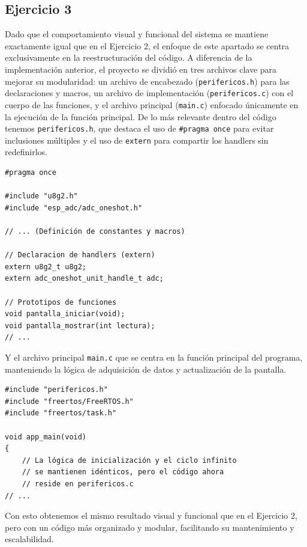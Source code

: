 \documentclass[12pt, letterpaper]{article}
\begin{document}
\subsection*{\fontsize{12}{17}\sffamily\selectfont Ejercicio 3}

Dado que el comportamiento visual y funcional del sistema se mantiene exactamente igual que en el Ejercicio 2, el enfoque de este apartado se centra exclusivamente en la reestructuración del código. A diferencia de la implementación anterior, el proyecto se dividió en tres archivos clave para mejorar su modularidad: un archivo de encabezado (\texttt{perifericos.h}) para las declaraciones y macros, un archivo de implementación (\texttt{perifericos.c}) con el cuerpo de las funciones, y el archivo principal (\texttt{main.c}) enfocado únicamente en la ejecución de la función principal. De lo más relevante dentro del código tenemos \texttt{perifericos.h}, que destaca el uso de \texttt{\#pragma once} para evitar inclusiones múltiples y el uso de \texttt{extern} para compartir los handlers sin redefinirlos.

\begin{lstlisting}[style=cstyle, caption={Archivo de encabezado \texttt{perifericos.h}.}, label={lst:perifericos_h}]
#pragma once

#include "u8g2.h"
#include "esp_adc/adc_oneshot.h"

// ... (Definición de constantes y macros)

// Declaracion de handlers (extern)
extern u8g2_t u8g2;
extern adc_oneshot_unit_handle_t adc;

// Prototipos de funciones
void pantalla_iniciar(void);
void pantalla_mostrar(int lectura);
// ...
\end{lstlisting}

Y el archivo principal \texttt{main.c} que se centra en la función principal del programa, manteniendo la lógica de adquisición de datos y actualización de la pantalla.

\begin{lstlisting}[style=cstyle, caption={Archivo principal \texttt{main.c}.}, label={lst:main_c}]
#include "perifericos.h"
#include "freertos/FreeRTOS.h"
#include "freertos/task.h"

void app_main(void)
{
    // La lógica de inicialización y el ciclo infinito
    // se mantienen idénticos, pero el código ahora
    // reside en perifericos.c
// ...
\end{lstlisting}

Con esto obtenemos el mismo resultado visual y funcional que en el Ejercicio 2, pero con un código más organizado y modular, facilitando su mantenimiento y escalabilidad.
\end{document}
